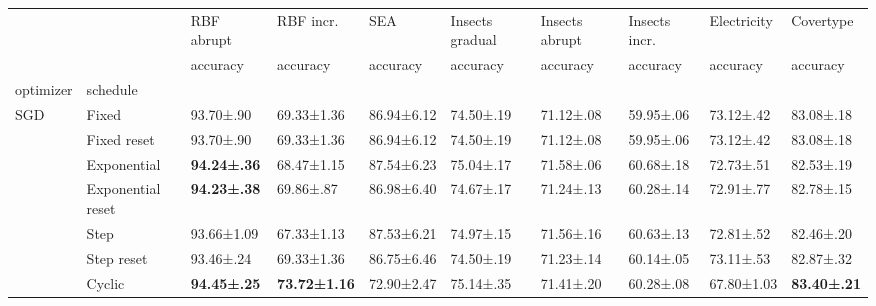\begin{tabular}{llllllllll}
    \toprule
                             &                   & RBF abrupt          & RBF incr.            & SEA                 & Insects gradual     & Insects abrupt      & Insects incr.       & Electricity         & Covertype           \\
                             &                   & accuracy            & accuracy             & accuracy            & accuracy            & accuracy            & accuracy            & accuracy            & accuracy            \\
    optimizer                & schedule          &                     &                      &                     &                     &                     &                     &                     &                     \\
    \midrule
    \multirow[c]{8}{*}{SGD}  & Fixed             & 93.70±.90           & 69.33±1.36           & 86.94±6.12          & 74.50±.19           & 71.12±.08           & 59.95±.06           & 73.12±.42           & 83.08±.18           \\
                             & Fixed reset       & 93.70±.90           & 69.33±1.36           & 86.94±6.12          & 74.50±.19           & 71.12±.08           & 59.95±.06           & 73.12±.42           & 83.08±.18           \\
                             & Exponential       & \bfseries 94.24±.36 & 68.47±1.15           & 87.54±6.23          & 75.04±.17           & 71.58±.06           & 60.68±.18           & 72.73±.51           & 82.53±.19           \\
                             & Exponential reset & \bfseries 94.23±.38 & 69.86±.87            & 86.98±6.40          & 74.67±.17           & 71.24±.13           & 60.28±.14           & 72.91±.77           & 82.78±.15           \\
                             & Step              & 93.66±1.09          & 67.33±1.13           & 87.53±6.21          & 74.97±.15           & 71.56±.16           & 60.63±.13           & 72.81±.52           & 82.46±.20           \\
                             & Step reset        & 93.46±.24           & 69.33±1.36           & 86.75±6.46          & 74.50±.19           & 71.23±.14           & 60.14±.05           & 73.11±.53           & 82.87±.32           \\
                             & Cyclic            & \bfseries 94.45±.25 & \bfseries 73.72±1.16 & 72.90±2.47          & 75.14±.35           & 71.41±.20           & 60.28±.08           & 67.80±1.03          & \bfseries 83.40±.21 \\

\end{tabular}
